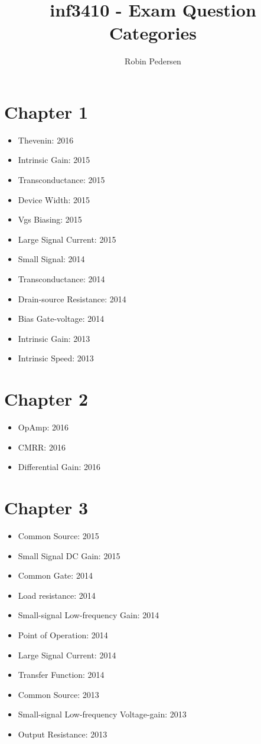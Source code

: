\documentclass[twocolumn]{article}
\begin{document}
  \title{inf3410 - Exam Question Categories}
  \author{Robin Pedersen}
  \maketitle

  \section*{Chapter 1}
    \begin{itemize}
      \item Thevenin: 2016

      \item Intrinsic Gain: 2015
      \item Transconductance: 2015
      \item Device Width: 2015
      \item Vgs Biasing: 2015
      \item Large Signal Current: 2015

      \item Small Signal: 2014
      \item Transconductance: 2014
      \item Drain-source Resistance: 2014
      \item Bias Gate-voltage: 2014

      \item Intrinsic Gain: 2013
      \item Intrinsic Speed: 2013
    \end{itemize}
  \section*{Chapter 2}
    \begin{itemize}
      \item OpAmp: 2016
      \item CMRR: 2016
      \item Differential Gain: 2016
    \end{itemize}
  \section*{Chapter 3}
    \begin{itemize}
      \item Common Source: 2015
      \item Small Signal DC Gain: 2015

      \item Common Gate: 2014
      \item Load resistance: 2014
      \item Small-signal Low-frequency Gain: 2014
      \item Point of Operation: 2014
      \item Large Signal Current: 2014
      \item Transfer Function: 2014

      \item Common Source: 2013
      \item Small-signal Low-frequency Voltage-gain: 2013
      \item Output Resistance: 2013
    \end{itemize}
\end{document}
